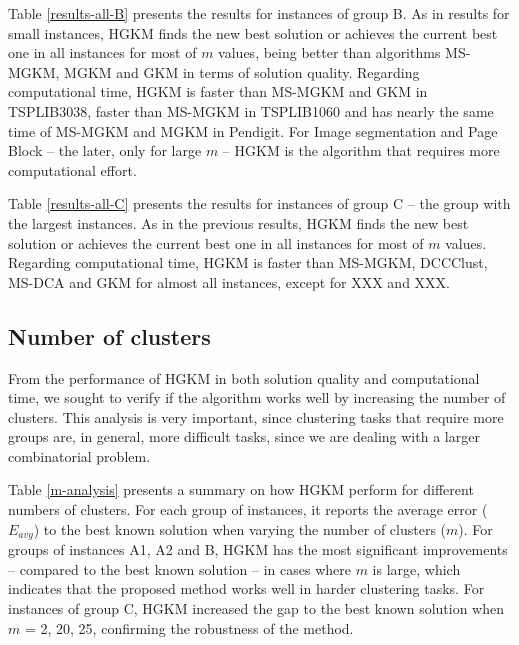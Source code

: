 Table \ref{results-all-B} presents the results for instances of group B. As in results for small instances, HGKM finds the new best solution or achieves the current best one in all instances for most of $m$ values, being better than algorithms MS-MGKM, MGKM and GKM in terms of solution quality. Regarding computational time, HGKM is faster than MS-MGKM and GKM in TSPLIB3038, faster than MS-MGKM in TSPLIB1060 and has nearly the same time of MS-MGKM and MGKM in Pendigit. For Image segmentation and Page Block -- the later, only for large $m$ -- HGKM is the algorithm that requires more computational effort.

Table \ref{results-all-C} presents the results for instances of group C -- the group with the largest instances. As in the previous results, HGKM finds the new best solution or achieves the current best one in all instances for most of $m$ values. Regarding computational time, HGKM is faster than MS-MGKM, DCCClust, MS-DCA and GKM for almost all instances, except for XXX and XXX.









\subsection{Number of clusters}
From the performance of HGKM in both solution quality and computational time, we sought to verify if the algorithm works well by increasing the number of clusters. This analysis is very important, since clustering tasks that require more groups are, in general, more difficult tasks, since we are dealing with a larger combinatorial problem.

Table \ref{m-analysis} presents a summary on how HGKM perform for different numbers of clusters.
For each group of instances, it reports the average error ($E_{avg}$) to the best known solution when varying the number of clusters ($m$). For groups of instances A1, A2 and B, HGKM has the most significant improvements -- compared to the best known solution -- in cases where $m$ is large, which indicates that the proposed method works well in harder clustering tasks. For instances of group C, HGKM increased the gap to the best known solution when $m$ = 2, 20, 25, confirming the robustness of the method.



